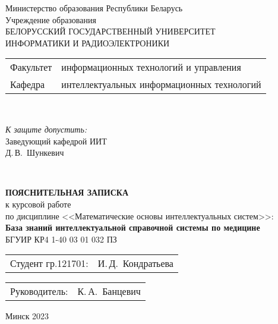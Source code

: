 \begin{titlepage}
	\begin{center}
		Министерство образования Республики Беларусь\\[1em]
		Учреждение образования\\
		БЕЛОРУССКИЙ ГОСУДАРСТВЕННЫЙ УНИВЕРСИТЕТ \\
		ИНФОРМАТИКИ И РАДИОЭЛЕКТРОНИКИ\\[1em]
		
		\begin{minipage}{\textwidth}
			\begin{flushleft}
				\begin{tabular}{ l l }
					Факультет & информационных технологий и управления\\
					Кафедра   & интеллектуальных информационных технологий
				\end{tabular}
			\end{flushleft}
		\end{minipage}\\[1em]
		
		\begin{flushright}
			\begin{minipage}{0.4\textwidth}
				\textit{К защите допустить:}\\[0.8em]
				Заведующий кафедрой ИИТ\\[0.45em]
				\underline{\hspace*{2.8cm}} Д.\,В.~Шункевич
			\end{minipage}\\[2.2em]
		\end{flushright}
		
		\textbf{ПОЯСНИТЕЛЬНАЯ ЗАПИСКА}\\
		{к курсовой работе}\\
		{по дисциплине <<Математические основы интеллектуальных систем>>:}\\[1em]
		\textbf{\large База знаний интеллектуальной справочной системы по медицине}\\[3em]
		
		
		{БГУИР КР4 1-40 03 01 032 ПЗ}\\[6em]
		\vspace{1em}
		\begin{tabular}{ p{}p{} }
			Студент гр.121701: & И.\,Д.~Кондратьева \\[1em]
			
		\end{tabular}
		\begin{tabular}{ p{}p{} }
			Руководитель: & К.\,А.~Банцевич \\[1em]
			
		\end{tabular}
		
		\vfill
		{\normalsize Минск 2023}
	\end{center}
\end{titlepage}